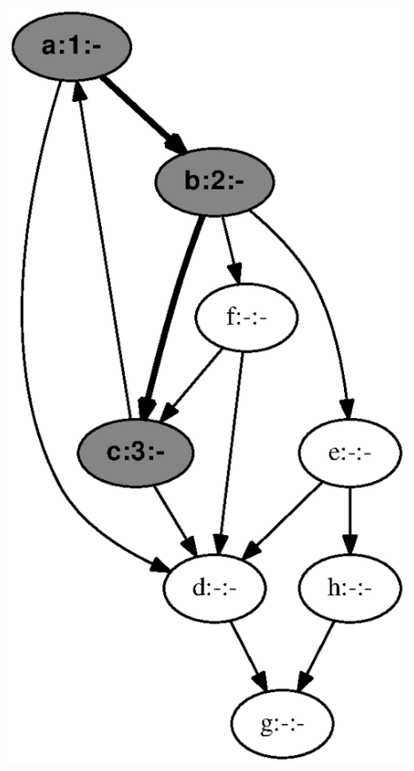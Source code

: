 \documentclass{article}
\begin{document}
\includegraphics[height=.3\textheight]{dfs_directed_classroom_03.eps}
\vspace{1em}
\end{document}
